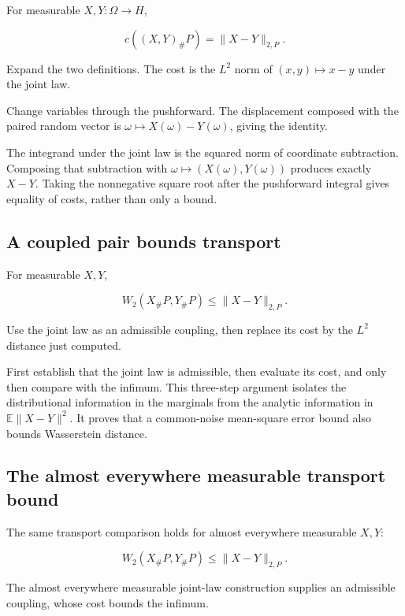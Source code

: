 \documentclass[11pt,a4paper]{report}
\begin{document}
For measurable \(X,Y:\Omega\to H\),

\[c((X,Y)_\#P)=\|X-Y\|_{2,P}.\]

Expand the two definitions. The cost is the \(L^2\) norm of \((x,y)\mapsto x-y\) under the joint law.



Change variables through the pushforward. The displacement composed with the paired random vector is \(\omega\mapsto X(\omega)-Y(\omega)\), giving the identity.



The integrand under the joint law is the squared norm of coordinate subtraction. Composing that subtraction with \(\omega\mapsto(X(\omega),Y(\omega))\) produces exactly \(X-Y\). Taking the nonnegative square root after the pushforward integral gives equality of costs, rather than only a bound.

\subsection{\texorpdfstring{A coupled pair bounds transport}{A coupled pair bounds transport}}
\label{report-step-UnadjustedLangevin-Coupling-lean-9}


For measurable \(X,Y\),

\[W_2(X_\#P,Y_\#P)\le\|X-Y\|_{2,P}.\]

Use the joint law as an admissible coupling, then replace its cost by the \(L^2\) distance just computed.



First establish that the joint law is admissible, then evaluate its cost, and only then compare with the infimum. This three-step argument isolates the distributional information in the marginals from the analytic information in \(\mathbb E\|X-Y\|^2\). It proves that a common-noise mean-square error bound also bounds Wasserstein distance.

\subsection{\texorpdfstring{The almost everywhere measurable transport bound}{The almost everywhere measurable transport bound}}
\label{report-step-UnadjustedLangevin-Coupling-lean-10}


The same transport comparison holds for almost everywhere measurable \(X,Y\):

\[W_2(X_\#P,Y_\#P)\le\|X-Y\|_{2,P}.\]

The almost everywhere measurable joint-law construction supplies an admissible coupling, whose cost bounds the infimum.
\end{document}
